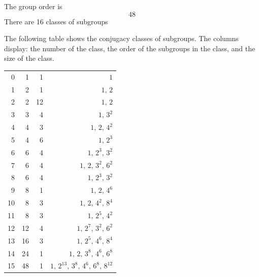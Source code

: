 The group order is 
$$
48
$$
There are 16 classes of subgroups\\

\bigskip

The following table shows the conjugacy classes of subgroups. The columns display: the number of the class, the order of the subgroups in the class, and the size of the class.\\

\bigskip

\begin{center}
\begin{tabular}{*{4}{r}}
0 & 1 & 1 & $1$\\
1 & 2 & 1 & $1,\,2$\\
2 & 2 & 12 & $1,\,2$\\
3 & 3 & 4 & $1,\,3^2$\\
4 & 4 & 3 & $1,\,2,\,4^2$\\
5 & 4 & 6 & $1,\,2^3$\\
6 & 6 & 4 & $1,\,2^3,\,3^2$\\
7 & 6 & 4 & $1,\,2,\,3^2,\,6^2$\\
8 & 6 & 4 & $1,\,2^3,\,3^2$\\
9 & 8 & 1 & $1,\,2,\,4^6$\\
10 & 8 & 3 & $1,\,2,\,4^2,\,8^4$\\
11 & 8 & 3 & $1,\,2^5,\,4^2$\\
12 & 12 & 4 & $1,\,2^7,\,3^2,\,6^2$\\
13 & 16 & 3 & $1,\,2^5,\,4^6,\,8^4$\\
14 & 24 & 1 & $1,\,2,\,3^8,\,4^6,\,6^8$\\
15 & 48 & 1 & $1,\,2^{13},\,3^8,\,4^6,\,6^8,\,8^{12}$\\
\end{tabular}
\end{center}
